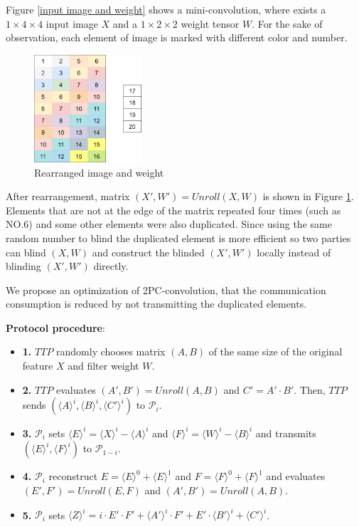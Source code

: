 \documentclass[letterpaper]{article} %
\begin{document}
    Figure \ref{input image and weight} shows a mini-convolution, 
    where exists a $1\times 4\times 4$ input image $X$  and a $1\times 2\times 2$ weight tensor $W$.
    For the sake of observation, each element of image is marked with different color and number.

    \begin{figure}[htbp]
        \centering
        \includegraphics[width=4cm]{new_unrolling2.png}
        \caption{Rearranged image and weight}
        \label{rearrangement of image and weight}
    \end{figure}
    
    After rearrangement, matrix $(X',W')=Unroll(X,W)$ 
    is shown in Figure \ref{rearrangement of image and weight}.
    Elements that are not at the edge of the matrix repeated four times (such as NO.6)
    and some other elements were also duplicated. 
    Since using the same random number to blind the duplicated element
    is more efficient so two parties can blind $(X,W)$ and 
    construct the blinded $(X',W')$ locally instead of blinding $(X',W')$ directly.

    
    We propose an optimization of 2PC-convolution,
    that the communication consumption is reduced by 
    not transmitting the duplicated elements.

    \textbf{Protocol procedure}:
    \begin{itemize}
        \item \textbf{1.} $TTP$ randomly chooses matrix $(A,B)$ of the same size of the original feature $X$ and filter weight $W$.
        \item \textbf{2.} $TTP$ evaluates $( A',B')=Unroll(A,B)$ and $C' =A'\cdot B' $. 
        Then, $TTP$ sends $(\langle A\rangle ^{i},\langle B\rangle ^{i},\langle C'\rangle ^{i})$ to $\mathcal{P}_{i}$.
        \item \textbf{3.} $\mathcal{P}_{i}$ sets $\langle E\rangle ^{i}=\langle X\rangle ^{i}-\langle A\rangle ^{i}$ 
        and $\langle F\rangle ^{i}=\langle W\rangle ^{i}-\langle B\rangle ^{i}$
        and transmits $(\langle E\rangle ^{i},\langle F\rangle ^{i})$ to $\mathcal{P}_{1-i}$.
        \item \textbf{4.} $\mathcal{P}_{i}$ reconstruct $E = \langle E\rangle ^{0}+\langle E\rangle ^{1}$ and $F = \langle F\rangle ^{0}+\langle F\rangle ^{1}$
        and evaluates $(E',F')=Unroll(E,F)$ and $(A',B')=Unroll(A,B)$.
        \item \textbf{5.} $\mathcal{P}_{i}$ sets $\langle Z\rangle^{i}=i\cdot E' \cdot F' + \langle A'\rangle^{i} \cdot F' + E' \cdot \langle B'\rangle^{i} + \langle C'\rangle^{i}$.
    
    \end{itemize}
\end{document}
